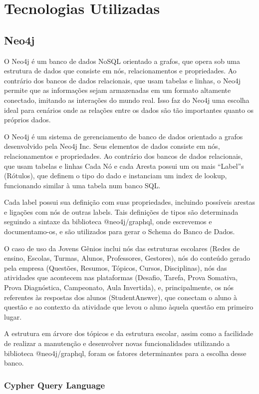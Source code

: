 \chapter{Tecnologias Utilizadas}
\label{chap3}

\section{Neo4j}
O Neo4j é um banco de dados NoSQL orientado a grafos, que opera sob uma estrutura de dados que consiste em nós, relacionamentos e propriedades. Ao contrário dos bancos de dados relacionais, que usam tabelas e linhas, o Neo4j permite que as informações sejam armazenadas em um formato altamente conectado, imitando as interações do mundo real. Isso faz do Neo4j uma escolha ideal para cenários onde as relações entre os dados são tão importantes quanto os próprios dados.

O Neo4j é um sistema de gerenciamento de banco de dados orientado a grafos desenvolvido pela Neo4j Inc. Seus elementos de dados consiste em nós, relacionamentos e propriedades. Ao contrário dos bancos de dados relacionais, que usam tabelas e linhas
Cada Nó e cada Aresta possui um ou mais “Label”s (Rótulos), que definem o tipo do dado e instanciam um index de lookup, funcionando similar à uma tabela num banco SQL.

Cada label possui sua definição com suas propriedades, incluindo possíveis arestas e ligações com nós de outras labels. Tais definições de tipos são determinada seguindo a sintaxe da biblioteca @neo4j/graphql, onde escrevemos e documentamo-os, e são utilizados para gerar o Schema do Banco de Dados.

O caso de uso da Jovens Gênios inclui nós das estruturas escolares (Redes de ensino, Escolas, Turmas, Alunos, Professores, Gestores), nós do conteúdo gerado pela empresa (Questões, Resumos, Tópicos, Cursos, Disciplinas), nós das atividades que acontecem nas plataformas (Desafio, Tarefa, Prova Somativa, Prova Diagnóstica, Campeonato, Aula Invertida), e, principalmente, os nós referentes às respostas dos alunos (StudentAnswer), que conectam o aluno à questão e ao contexto da atividade que levou o aluno àquela questão em primeiro lugar.

A estrutura em árvore dos tópicos e da estrutura escolar, assim como a facilidade de realizar a manutenção e desenvolver novas funcionalidades utilizando a biblioteca @neo4j/graphql, foram os fatores determinantes para a escolha desse banco.
\subsection{Cypher Query Language}


